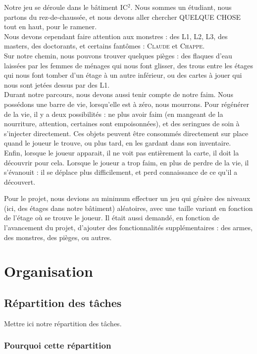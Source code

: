 \documentclass[12pt]{report}
\begin{document}
	Notre jeu se déroule dans le bâtiment IC$^2$. Nous sommes un étudiant, nous partons du rez-de-chaussée, et nous devons aller chercher QUELQUE CHOSE tout en haut, pour le ramener. \\
	Nous devons cependant faire attention aux monstres : des L1, L2, L3, des masters, des doctorants, et certains fantômes : \textsc{Claude} et \textsc{Chappe}.\\
	Sur notre chemin, nous pouvons trouver quelques pièges : des flaques d'eau laissées par les femmes de ménages qui nous font glisser, des trous entre les étages qui nous font tomber d'un étage à un autre inférieur, ou des cartes à jouer qui nous sont jetées dessus par des L1.\\
	Durant notre parcours, nous devons aussi tenir compte de notre faim. Nous possédons une barre de vie, lorsqu'elle est à zéro, nous mourrons. Pour régénérer de la vie, il y a deux possibilités : ne plus avoir faim (en mangeant de la nourriture, attention, certaines sont empoisonnées), et des seringues de soin à s'injecter directement. Ces objets peuvent être consommés directement sur place quand le joueur le trouve, ou plus tard, en les gardant dans son inventaire.\\
	Enfin, lorsque le joueur apparait, il ne voit pas entièrement la carte, il doit la découvrir pour cela. Lorsque le joueur a trop faim, en plus de perdre de la vie, il s'évanouit : il se déplace plus difficilement, et perd connaissance de ce qu'il a découvert.
	
	\vspace{12pt}
	
	Pour le projet, nous devions au minimum effectuer un jeu qui génère des niveaux (ici, des étages dans notre bâtiment) aléatoires, avec une taille variant en fonction de l'étage où se trouve le joueur. Il était aussi demandé, en fonction de l'avancement du projet, d'ajouter des fonctionnalités supplémentaires : des armes, des monstres, des pièges, ou autres.

\chapter{Organisation}

	\section{Répartition des tâches}
		Mettre ici notre répartition des tâches.
		\subsection{Pourquoi cette répartition}
\end{document}
